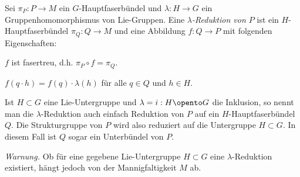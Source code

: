 \documentclass[%
	paper=a5,%
	fleqn,%
	DIV=18,%
	BCOR=0mm,
	fontsize=11pt,
	titlepage=false,%
	bibliography=totoc,
	DIV=18,%
	twoside=true,
	pdftitle=Riemannsche Geometrie,
	pdfauthor=Uwe Semmelmann,
	numbers=noendperiod]%
	{scrbook}
\begin{document}
\begin{defn}
Sei $\pi_P: P\to M$ ein $G$-Hauptfaserbündel und $\lambda: H\to G$ ein
Gruppenhomomorphismus von Lie-Gruppen. Eine \emph{$\lambda$-Reduktion von $P$}
ist ein $H$-Hauptfaserbündel $\pi_Q: Q\to M$ und eine Abbildung $f: Q\to P$ mit
folgenden Eigenschaften:
\begin{defnenum}
  \item $f$ ist fasertreu, d.h. $\pi_P\circ f = \pi_Q$.
  \item $f(q\cdot h) = f(q)\cdot \lambda(h)$ für alle $q\in Q$ und $h\in
  H$.
\end{defnenum}

\centering
{}\fish
\end{defn}

\begin{rem}[Bemerkungen.]
\begin{remenum}
\item
Ist $H\subset G$ eine Lie-Untergruppe und $\lambda = i: H\opento G$ die
Inklusion, so nennt man die $\lambda$-Reduktion auch einfach Reduktion von
$P$ auf ein $H$-Hauptfaserbündel $Q$.
Die Strukturgruppe von $P$ wird also reduziert auf die Untergruppe $H\subset
G$. In diesem Fall ist $Q$ sogar ein Unterbündel von $P$.
\item \textit{Warnung.} Ob für eine gegebene Lie-Untergruppe $H\subset G$ eine $\lambda$-Reduktion existiert, hängt jedoch von der Mannigfaltigkeit $M$ ab.\map
\end{remenum}
\end{rem}

\end{document}
